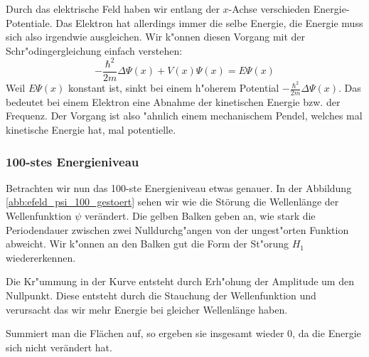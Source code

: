 \begin{refsection}
Durch das elektrische Feld haben wir entlang der $x$-Achse verschieden Energie-Potentiale.
Das Elektron hat allerdings immer die selbe Energie,
die Energie muss sich also irgendwie ausgleichen.
Wir k"onnen diesen Vorgang mit der Schr"odingergleichung einfach verstehen:
\[
-\frac{\hbar^2}{2m}\Delta\Psi(x) + V(x)\Psi(x)
=
E \Psi(x)
\]
Weil $E \Psi(x)$ konstant ist, sinkt bei einem h"oherem Potential $-\frac{\hbar^2}{2m}\Delta\Psi(x)$.
Das bedeutet bei einem Elektron eine Abnahme der kinetischen Energie bzw. der Frequenz.
Der Vorgang ist also "ahnlich einem mechanischem Pendel, 
welches mal kinetische Energie hat, mal potentielle.



\subsubsection{100-stes Energieniveau}
Betrachten wir nun das 100-ste Energieniveau etwas genauer.
In der Abbildung \ref{abb:efeld_psi_100_gestoert} sehen wir wie die St\"orung 
die Wellenl\"ange der Wellenfunktion $\psi$ ver\"andert.
Die gelben Balken geben an, wie stark die Periodendauer zwischen zwei Nulldurchg"angen
von der ungest"orten Funktion abweicht.
Wir k"onnen an den Balken gut die Form der St"orung $H_1$ wiedererkennen.

Die Kr"ummung in der Kurve entsteht durch Erh"ohung der Amplitude um den Nullpunkt.
Diese entsteht durch die Stauchung der Wellenfunktion und verursacht das wir mehr Energie
bei gleicher Wellenl\"ange haben.

Summiert man die Fl\"achen auf, so ergeben sie insgesamt wieder $0$, da die Energie sich nicht ver\"andert hat.



\end{refsection}
